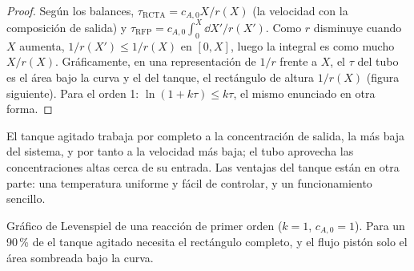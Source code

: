 \begin{proof}
Según los balances, $\tau_{\text{RCTA}} = c_{A,0}X/r(X)$ (la velocidad con la composición
de salida) y $\tau_{\text{RFP}} = c_{A,0}\int_0^X\dd X'/r(X')$. Como $r$
disminuye cuando $X$ aumenta, $1/r(X') \leq 1/r(X)$ en $[0, X]$, luego la
integral es como mucho $X/r(X)$. Gráficamente, en una representación de $1/r$ frente a $X$, el
$\tau$ del tubo es el área bajo la curva y el del tanque, el rectángulo de
altura $1/r(X)$ (figura siguiente). Para el orden 1: $\ln(1 + k\tau) \leq k\tau$, el
mismo enunciado en otra forma.
\end{proof}

El tanque agitado trabaja por completo a la concentración de salida, la más baja
del sistema, y por tanto a la velocidad más baja; el tubo aprovecha las concentraciones altas
cerca de su entrada. Las ventajas del tanque están en otra parte: una temperatura uniforme y fácil de controlar,
y un funcionamiento sencillo.

\begin{omfigure}

{\small Gráfico de Levenspiel de una reacción de primer orden ($k = 1$, $c_{A,0} = 1$).
Para un 90\,\% de  el tanque agitado necesita el rectángulo completo, y el flujo
pistón solo el área sombreada bajo la curva.}
\end{omfigure}


